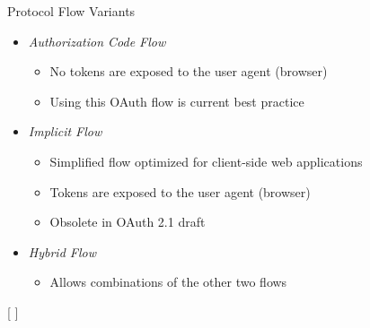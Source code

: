 \documentclass[aspectratio=169]{beamer}
\begin{document}
\begin{frame}{Protocol Flow Variants}
	\begin{itemize}
		\item \emph{Authorization Code Flow} \hfill {\scriptsize \cite[3.1]{oidc-core}}
		\begin{itemize}
			\item No tokens are exposed to the user agent (\ie browser) 
			\item Using this OAuth flow  is current best practice \cite{RFC7636, ietf-oauth-security}
		\end{itemize}
		\item \emph{Implicit Flow} \hfill {\scriptsize \cite[3.2]{oidc-core}}
		\begin{itemize}
			\item Simplified flow optimized for client-side web applications
			\item Tokens are exposed to the user agent (\ie browser)
			\item Obsolete in OAuth 2.1 draft \cite{ietf-oauth-2.1} 
		\end{itemize}
		\item \emph{Hybrid Flow} \hfill {\scriptsize \cite[3.3]{oidc-core}}
		\begin{itemize}
			\item Allows combinations of the other two flows
		\end{itemize}
	\end{itemize}
\end{frame}

[
	\label{auth-code-flow}
]
\end{document}
